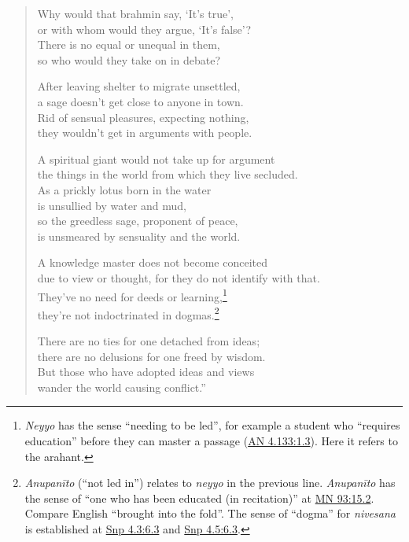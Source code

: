 \documentclass[12pt,openany]{book}%
\begin{document}
\begin{verse}
Why would that brahmin say, ‘It’s true’, \\
or with whom would they argue, ‘It’s false’? \\
There is no equal or unequal in them, \\
so who would they take on in debate? 

After leaving shelter to migrate unsettled, \\
a sage doesn’t get close to anyone in town. \\
Rid of sensual pleasures, expecting nothing, \\
they wouldn’t get in arguments with people. 

A spiritual giant would not take up for argument \\
the things in the world from which they live secluded. \\
As a prickly lotus born in the water \\
is unsullied by water and mud, \\
so the greedless sage, proponent of peace, \\
is unsmeared by sensuality and the world. 

A knowledge master does not become conceited \\
due to view or thought, for they do not identify with that. \\
They’ve no need for deeds or learning,\footnote{\textit{Neyyo} has the sense “needing to be led”, for example a student who “requires education” before they can master a passage (\href{https://suttacentral.net/an4.133/en/sujato\#1.3}{AN 4.133:1.3}). Here it refers to the arahant. } \\
they’re not indoctrinated in dogmas.\footnote{\textit{\textsanskrit{Anupanīto}} (“not led in”) relates to \textit{neyyo} in the previous line. \textit{\textsanskrit{Anupanīto}} has the sense of “one who has been educated (in recitation)” at \href{https://suttacentral.net/mn93/en/sujato\#15.2}{MN 93:15.2}. Compare English “brought into the fold”. The sense of “dogma” for \textit{nivesana} is established at \href{https://suttacentral.net/snp4.3/en/sujato\#6.3}{Snp 4.3:6.3} and \href{https://suttacentral.net/snp4.5/en/sujato\#6.3}{Snp 4.5:6.3}. } 

There are no ties for one detached from ideas; \\
there are no delusions for one freed by wisdom. \\
But those who have adopted ideas and views \\
wander the world causing conflict.” 

%
\end{verse}
\end{document}

